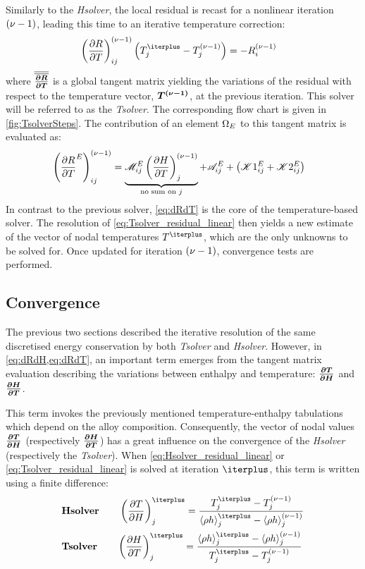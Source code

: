 Similarly to the \emph{Hsolver}, the local residual is recast for a nonlinear iteration ${\left( \nu-1 \right)}$, 
leading this time to an iterative temperature correction:
\begin{align}
\label{eq:Tsolver_residual_linear}
& \brac{\dRdT}^\iter_{ij} \brac{\Tj^\iterplus - \Tj^\iter} = -R_i^\iter
\end{align}
where ${\overline{\overline{\boldsymbol{\frac{\partial R}{\partial T}}}}}$ is a global tangent matrix yielding the variations of the residual with respect to the temperature vector, $\boldsymbol{T^{{\left( \nu-1 \right)}}}$, at the previous iteration. 
This solver will be referred to as the \emph{Tsolver}. The corresponding flow chart is given in \cref{fig:TsolverSteps}.
The contribution of an element $\Omega_E$ to this tangent matrix is evaluated as:
\begin{align}
\label{eq:dRdT}
& \left( \frac{\partial R}{\partial T}^E \right)^{{\left( \nu-1 \right)}}_{ij}
= \underbrace{\mathscr{M}_{ij}^E \left( \frac{\partial H}{\partial T} \right)^{{\left( \nu-1 \right)}}_{j}}_{\text{no sum on }j}
+ \mathscr{A}_{ij}^E
+ \left( \mathscr{K}1_{ij}^E + \mathscr{K}2_{ij}^E \right)
\end{align}
In contrast to the previous solver, \cref{eq:dRdT} is the core of the temperature-based solver. The resolution of \cref{eq:Tsolver_residual_linear} 
then yields a new estimate of the vector of nodal temperatures $T^\iterplus$, which are the only unknowns to be solved for. 
Once updated for iteration ${\left( \nu-1 \right)}$, convergence tests are performed.
%
%
\subsection{Convergence}
%
The previous two sections described the iterative resolution of the same discretised energy 
conservation by both \emph{Tsolver} and \emph{Hsolver}. However, in \cref{eq:dRdH,eq:dRdT}, an important 
term emerges from the tangent matrix evaluation describing the variations between enthalpy and temperature: 
$\boldsymbol{\frac{\partial T}{\partial H}}$ and $\boldsymbol{\frac{\partial H}{\partial T}}$. 

This term invokes the previously mentioned temperature-enthalpy 
tabulations which depend on the alloy composition. Consequently, the vector of nodal values $\boldsymbol{\frac{\partial T}{\partial H}}$ (respectively $\boldsymbol{\frac{\partial H}{\partial T}}$)
has a great influence on the convergence of the \emph{Hsolver} (respectively the \emph{Tsolver}). 
When \cref{eq:Hsolver_residual_linear} or \cref{eq:Tsolver_residual_linear} 
is solved at iteration $\iterplus$, this term is written using a finite difference:
\begin{align}
\label{eq:finite_difference_Hsolver}
& \textbf{Hsolver} \qquad \brac{\dTdH}^{\iterplus}_{j} = \frac{T_j^\iterplus - T_j^\iter}{\rhoh_j^\iterplus - \rhoh_j^\iter} \\ 
\label{eq:finite_difference_Tsolver}
& \textbf{Tsolver} \qquad \brac{\dHdT}^{\iterplus}_{j} = \frac{\rhoh_j^\iterplus - \rhoh_j^\iter}{T_j^\iterplus - T_j^\iter}
\end{align}

